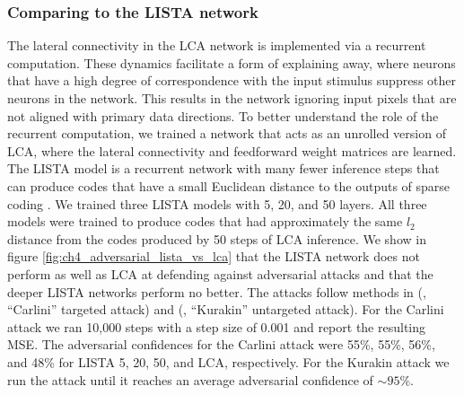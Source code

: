 \subsubsection{Comparing to the LISTA network}
The lateral connectivity in the LCA network is implemented via a recurrent computation. These dynamics facilitate a form of explaining away, where neurons that have a high degree of correspondence with the input stimulus suppress other neurons in the network. This results in the network ignoring input pixels that are not aligned with primary data directions. To better understand the role of the recurrent computation, we trained a network that acts as an unrolled version of LCA, where the lateral connectivity and feedforward weight matrices are learned. The LISTA model is a recurrent network with many fewer inference steps that can produce codes that have a small Euclidean distance to the outputs of sparse coding \parencite{gregor2010learning}. We trained three LISTA models with 5, 20, and 50 layers. All three models were trained to produce codes that had approximately the same $l_{2}$ distance from the codes produced by 50 steps of LCA inference. We show in figure \ref{fig:ch4_adversarial_lista_vs_lca} that the LISTA network does not perform as well as LCA at defending against adversarial attacks and that the deeper LISTA networks perform no better. The attacks follow methods in (\cite{carlini2017towards}, ``Carlini'' targeted attack) and (\cite{kurakin2016adversarial}, ``Kurakin'' untargeted attack). For the Carlini attack we ran 10,000 steps with a step size of 0.001 and report the resulting MSE. The adversarial confidences for the Carlini attack were 55\%, 55\%, 56\%, and 48\% for LISTA 5, 20, 50, and LCA, respectively. For the Kurakin attack we run the attack until it reaches an average adversarial confidence of $\sim 95$\%. 

